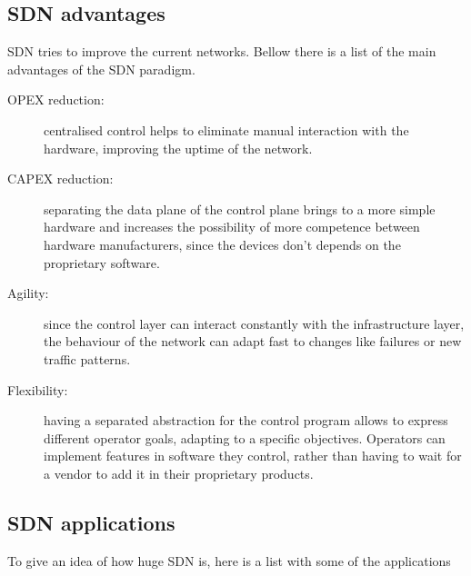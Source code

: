 \subsection{SDN advantages} 

SDN tries to improve the current networks. Bellow there is a list of the main advantages of the SDN paradigm.

\begin{description}
\item[OPEX reduction:] centralised control helps to eliminate manual interaction with the hardware, improving the uptime of the network. 
\item[CAPEX reduction:] separating the data plane of the control plane brings to a more simple hardware and increases the possibility of more competence between hardware manufacturers, since the devices don't depends on the proprietary software.
\item[Agility:] since the control layer can interact constantly with the infrastructure layer, the behaviour of the network can adapt fast to changes like failures or new traffic patterns. 
\item[Flexibility:] having a separated abstraction for the control program allows to express different operator goals, adapting to a specific objectives. Operators can implement features in software they control, rather than having to wait for a vendor to add it in their proprietary products.
\end{description}



\subsection{SDN applications}

To give an idea of how huge SDN is, here is a list with some of the applications 

